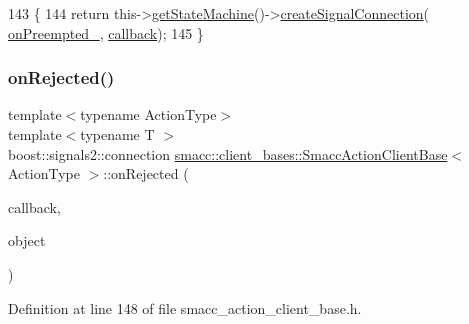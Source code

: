 \begin{DoxyCode}
143     \{
144         \textcolor{keywordflow}{return} this->\hyperlink{classsmacc_1_1ISmaccClient_aec51d4712404cb9882b86e4c854bb93a}{getStateMachine}()->\hyperlink{classsmacc_1_1ISmaccStateMachine_adf0f42ade0c65cc471960fe2a7c42da2}{createSignalConnection}(
      \hyperlink{classsmacc_1_1client__bases_1_1SmaccActionClientBase_a23846f928b48b5da809690883044b14b}{onPreempted\_}, \hyperlink{sm__ridgeback__barrel__search__1_2servers_2opencv__perception__node_2opencv__perception__node_8cpp_a050e697bd654facce10ea3f6549669b3}{callback});
145     \}
\end{DoxyCode}
\mbox{\label{classsmacc_1_1client__bases_1_1SmaccActionClientBase_a4a0f2dc95e6fbc7f25821f57e23b7905}} 
\subsubsection{\texorpdfstring{on\+Rejected()}{onRejected()}\hspace{0.1cm}{\footnotesize\ttfamily [1/2]}}
{\footnotesize\ttfamily template$<$typename Action\+Type$>$ \\
template$<$typename T $>$ \\
boost\+::signals2\+::connection \hyperlink{classsmacc_1_1client__bases_1_1SmaccActionClientBase}{smacc\+::client\+\_\+bases\+::\+Smacc\+Action\+Client\+Base}$<$ Action\+Type $>$\+::on\+Rejected (\begin{DoxyParamCaption}\item[{void(T\+::$\ast$)(Result\+Const\+Ptr \&)}]{callback,  }\item[{T $\ast$}]{object }\end{DoxyParamCaption})\hspace{0.3cm}{\ttfamily [inline]}}



Definition at line 148 of file smacc\+\_\+action\+\_\+client\+\_\+base.\+h.


